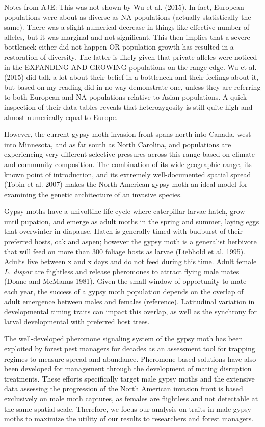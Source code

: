 \documentclass[smallextended]{svjour3}
\begin{document}
Notes from AJE: This was not shown by Wu et al. (2015). In fact, European
populations were about as diverse as NA populations (actually statistically 
the
same). There was a slight numerical decrease in things like effective number of
alleles, but it was marginal and not significant.  This then implies that a
severe bottleneck either did not happen OR population growth has resulted in a
restoration of diversity. The latter is likely given that private alleles were
noticed in the EXPANDING AND GROWING populations on the range edge.  Wu et al.
(2015) did talk a lot about their belief in a bottleneck and their feelings
about it, but based on my reading did in no way demonstrate one, unless they
are
referring to both European and NA populations relative to Asian populations. A
quick inspection of their data tables reveals that heterozygosity is still
quite
high and almost numerically equal to Europe.

However, the current gypsy moth invasion front spans north into Canada, west
into Minnesota, and as far south as North Carolina, and populations are
experiencing very different selective pressures across this range based on
climate and community composition. The combination of its wide geographic
range,
its known point of introduction, and its extremely well-documented spatial
spread (Tobin et al. 2007) makes the North American gypsy moth an ideal model
for examining the genetic architecture of an invasive species.

Gypsy moths have a univoltine life cycle where caterpillar larvae hatch, grow
until pupation, and emerge as adult moths in the spring and summer, laying eggs
that overwinter in diapause. Hatch is generally timed with budburst of their
preferred hosts, oak and aspen; however the gypsy moth is a generalist
herbivore
that will feed on more than 300 foliage hosts as larvae (Liebhold et al. 1995).
Adults live between x and x days and do not feed during this time. Adult female
\textit{L. dispar} are flightless and release pheromones to attract flying male
mates (Doane and McManus 1981). Given the small window of opportunity to mate
each year, the success of a gypsy moth population depends on the overlap of
adult
emergence between males and females (reference). Latitudinal variation in
developmental timing traits can impact this overlap, as well as the synchrony
for larval developmental with preferred host trees.

The well-developed pheromone signaling system of the gypsy moth has been
exploited by forest pest managers for decades as an assessment tool for
trapping
regimes to measure spread and abundance. Pheromone-based solutions have also
been developed for management through the development of mating disruption
treatments. These efforts specifically target male gypsy moths and the
extensive
data assessing the progression of the North American invasion front is based
exclusively on male moth captures, as females are flightless and not detectable
at the same spatial scale. Therefore, we focus our analysis on traits in male
gypsy moths to maximize the utility of our results to researchers and forest
managers.
\end{document}
